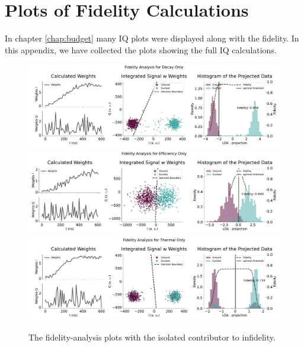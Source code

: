 \chapter{Plots of Fidelity Calculations}\label{chap:code_documentation}
In chapter \ref{chap:budget} many IQ plots were displayed along with the fidelity. In this appendix, we have collected the plots showing the full IQ calculations.

\begin{figure}[h]
    \centering
    \includegraphics{Simulations/budgets/figures/decay_only_sme.pdf}
    \includegraphics{Simulations/budgets/figures/efficiency_only_sme.pdf}
    \includegraphics{Simulations/budgets/figures/thermal_only_sme.pdf}
    \caption{The fidelity-analysis plots with the isolated contributor to infidelity.}
    \label{fig:enter-label}
\end{figure}

